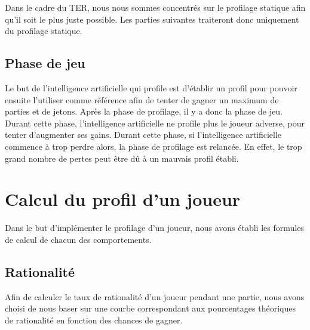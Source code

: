 \documentclass{report}
\begin{document}
Dans le cadre du TER, nous nous sommes concentrés sur le profilage statique afin qu'il soit le plus juste possible. Les parties suivantes traiteront donc uniquement du profilage statique. \par


\section{Phase de jeu}

\hspace{0.5cm}Le but de l'intelligence artificielle qui profile est d'établir un profil pour pouvoir ensuite l'utiliser comme référence afin de tenter de gagner un maximum de parties et de jetons. Après la phase de profilage, il y a donc la phase de jeu. Durant cette phase, l'intelligence artificielle ne profile plus le joueur adverse, pour tenter d'augmenter ses gains. Durant cette phase, si l'intelligence artificielle commence à trop perdre alors, la phase de profilage est relancée. En effet, le trop grand nombre de pertes peut être dû à un mauvais profil établi. \par




\chapter{Calcul du profil d'un joueur}


\hspace{0.5cm}Dans le but d'implémenter le profilage d'un joueur, nous avons établi les formules de calcul de chacun des comportements. \par

\section{Rationalité}

\hspace{0.5cm}Afin de calculer le taux de rationalité d'un joueur pendant une partie, nous avons choisi de nous baser sur une courbe correspondant aux pourcentages théoriques de rationalité en fonction des chances de gagner. 
\end{document}
